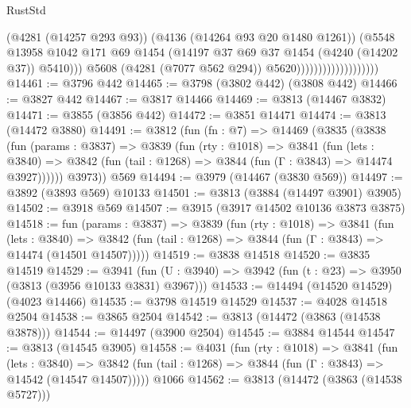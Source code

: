 \begin{lexlean}{RustStd}
\begin{coremodule}
                                            (@4281 (@14257 @293 @93))
                                            (@4136 (@14264 @93 @20 @1480 @1261))
                                            (@5548
                                              @13958
                                              @1042
                                              @171
                                              @69
                                              @1454
                                              (@14197
                                                @37
                                                @69
                                                @37
                                                @1454
                                                (@4240 (@14202 @37))
                                                @5410)))
                                          @5608
                                          (@4281 (@7077 @562 @294))
                                          @5620)))))))))))))))))))
@14461 := @3796 @442
@14465 := @3798 (@3802 @442) (@3808 @442)
@14466 := @3827 @442
@14467 := @3817 @14466
@14469 := @3813 (@14467 @3832)
@14471 := @3855 (@3856 @442)
@14472 := @3851 @14471
@14474 := @3813 (@14472 @3880)
@14491 := @3812
    (fun (fn : @7) =>
    @14469
      (@3835
        (@3838
          (fun (params : @3837) =>
          @3839
            (fun (rty : @1018) =>
            @3841
              (fun (lets : @3840) =>
              @3842 (fun (tail : @1268) => @3844 (fun (Γ : @3843) => @14474 @3927))))))
        @3973))
    @569
@14494 := @3979 (@14467 (@3830 @569))
@14497 := @3892 (@3893 @569) @10133
@14501 := @3813 (@3884 (@14497 @3901) @3905)
@14502 := @3918 @569
@14507 := @3915 (@3917 @14502 @10136 @3873 @3875)
@14518 := fun (params : @3837) =>
  @3839
    (fun (rty : @1018) =>
    @3841
      (fun (lets : @3840) =>
      @3842 (fun (tail : @1268) => @3844 (fun (Γ : @3843) => @14474 (@14501 @14507)))))
@14519 := @3838 @14518
@14520 := @3835 @14519
@14529 := @3941
    (fun (U : @3940) => @3942 (fun (t : @23) => @3950 (@3813 (@3956 @10133 @3831) @3967)))
@14533 := @14494 (@14520 @14529) (@4023 @14466)
@14535 := @3798 @14519 @14529
@14537 := @4028 @14518 @2504
@14538 := @3865 @2504
@14542 := @3813 (@14472 (@3863 (@14538 @3878)))
@14544 := @14497 (@3900 @2504)
@14545 := @3884 @14544
@14547 := @3813 (@14545 @3905)
@14558 := @4031
    (fun (rty : @1018) =>
    @3841
      (fun (lets : @3840) =>
      @3842 (fun (tail : @1268) => @3844 (fun (Γ : @3843) => @14542 (@14547 @14507)))))
    @1066
@14562 := @3813 (@14472 (@3863 (@14538 @5727)))

\end{coremodule}
\end{lexlean}
